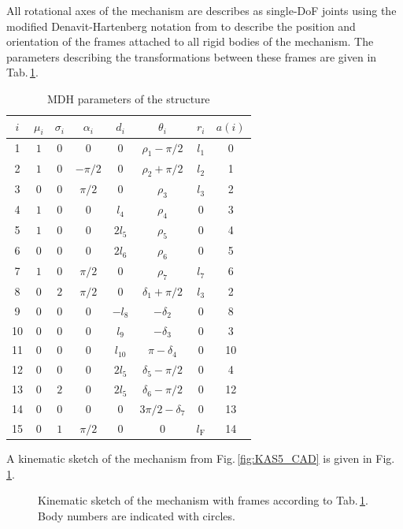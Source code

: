 \documentclass[letterpaper, 10 pt, conference]{ieeeconf}  %
\begin{document}
All rotational axes of the mechanism are describes as single-DoF joints using the modified Denavit-Hartenberg notation from \cite{KhalilKle1986} to describe the position and orientation of the frames attached to all rigid bodies of the mechanism.
The parameters describing the transformations between these frames are given in Tab.\,\ref{tab:mdh_parameter}.
%
\begin{table}
    \begin{tabular}[t]{|c||c|c||c|c|c|c|c|}
        \hline
        $i$ & $\mu_i$ & $\sigma_i$ & $\alpha_i$ & $d_i$ & $\theta_i$ & $r_i$ & $a(i)$ \\
        \hline
        1 & $1$ & $0$ & $0$ & $0$ & $\rho_1-\pi/2$ & $l_1$ & 0 \\
        2 & $1$ & $0$ & $-\pi/2$ & $0$ & $\rho_2+\pi/2$ & $l_2$ & 1 \\
        3 & $0$ & $0$ & $\pi/2$ & $0$ & $\rho_3$ & $l_3$ & 2 \\
        4 & $1$ & $0$ & $0$ & $l_4$ & $\rho_4$ & $0$ & 3 \\
        5 & $1$ & $0$ & $0$ & $2l_{5}$ & $\rho_5$ & $0$ & 4 \\
        6 & $0$ & $0$ & $0$ & $2l_{6}$ & $\rho_6$ & $0$ & 5 \\
        7 & $1$ & $0$ & $\pi/2$ & $0$ & $\rho_7$ & $l_{7}$ & 6 \\
        8 & $0$ & $2$ & $\pi/2$ & $0$ & $\delta_{1}+\pi/2$ & $l_{3}$ & 2 \\
        9 & $0$ & $0$ & $0$ & $-l_{8}$ & $-\delta_{2}$ & $0$ & 8 \\
        10 & $0$ & $0$ & $0$ & $l_{9}$ & $-\delta_{3}$ & $0$ & 3 \\
        11 & $0$ & $0$ & $0$ & $l_{10}$ & $\pi-\delta_{4}$ & $0$ & 10 \\
        12 & $0$ & $0$ & $0$ & $2l_{5}$ & $\delta_{5}-\pi/2$ & $0$ & 4 \\
        13 & $0$ & $2$ & $0$ & $2l_{5}$ & $\delta_{6}-\pi/2$ & $0$ & 12 \\
        14 & $0$ & $0$ & $0$ & $0$ & $3\pi/2-\delta_{7}$ & $0$ & 13 \\
        15 & $0$ & $1$ & $\pi/2$ & $0$ & $0$ & $l_{\mathrm{F}}$ & 14 \\
        \hline
    \end{tabular}
    \caption{MDH parameters of the structure}
    \label{tab:mdh_parameter}
\end{table}
%
A kinematic sketch of the mechanism from Fig.\,\ref{fig:KAS5_CAD} is given in Fig.\,\ref{fig:KAS5_kinematik}.
%
\begin{figure}[tb]
    \small
    \begin{minipage}[t]{7.5cm}
        \vspace{0.2cm} %
        
    \end{minipage}
    
    \caption{Kinematic sketch of the mechanism with frames according to Tab.\,\ref{tab:mdh_parameter}. Body numbers are indicated with circles.}
    \label{fig:KAS5_kinematik}
\end{figure}
\end{document}
